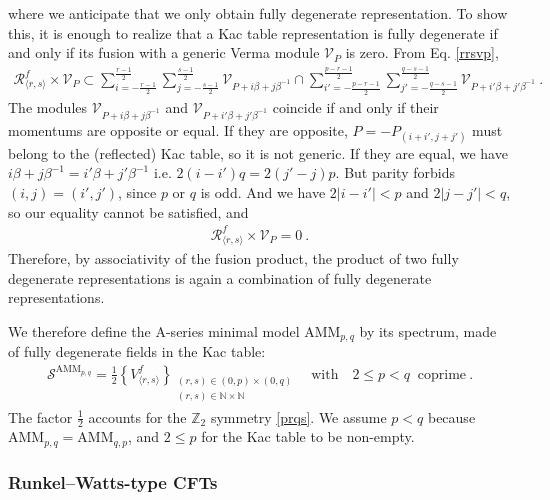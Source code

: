 \documentclass[12pt, a4paper]{article}
\theoremstyle{break}
\begin{document}
where we anticipate that we only obtain fully degenerate representation. To show this, it is enough to realize that a Kac table representation is fully degenerate if and only if its fusion with a generic Verma module $\mathcal{V}_P$ is zero. From Eq. \eqref{rrsvp}, 
\begin{align}
 \mathcal{R}^f_{\langle r,s\rangle}\times \mathcal{V}_P \subset \sum_{i=-\frac{r-1}{2}}^{\frac{r-1}{2}} \sum_{j=-\frac{s-1}{2}}^{\frac{s-1}{2}} \mathcal{V}_{P+i\beta +j\beta^{-1}} \cap \sum_{i'=-\frac{p-r-1}{2}}^{\frac{p-r-1}{2}} \sum_{j'=-\frac{q-s-1}{2}}^{\frac{q-s-1}{2}} \mathcal{V}_{P+i'\beta +j'\beta^{-1}}\ .
\end{align}
The modules $\mathcal{V}_{P+i\beta +j\beta^{-1}}$ and $\mathcal{V}_{P+i'\beta +j'\beta^{-1}}$ coincide if and only if their momentums are opposite or equal. If they are opposite, $P=-P_{(i+i',j+j')}$ must belong to the (reflected) Kac table, so it is not generic. If they are equal, we have $i\beta +j\beta^{-1} = i'\beta +j'\beta^{-1}$ i.e. $2(i-i')q = 2(j'-j)p$. 
But parity forbids $(i,j)=(i',j')$, since $p$ or $q$ is odd. And we have $2|i-i'|<p$ and $2|j-j'|<q$, so our equality cannot be satisfied, and 
\begin{align}
 \mathcal{R}^f_{\langle r,s\rangle}\times \mathcal{V}_P = 0 \ . 
\end{align}
Therefore, by associativity of the fusion product, the product of two fully degenerate representations is again a combination of fully degenerate representations.

We therefore define the A-series minimal model AMM$_{p,q}$ by its spectrum, made of fully degenerate fields in the Kac table:
\begin{align}
 \boxed{\mathcal{S}^{\text{AMM}_{p,q}} = \frac12\left\{ V^f_{\langle r,s\rangle} \right\}_{\substack{(r,s)\in (0,p) \times (0,q)\\ (r,s)\in \mathbb{N}\times \mathbb{N}}} \quad \text{with} \quad 2\leq p<q\ \text{ coprime}}\ .
 \label{samm}
\end{align}
The factor $\frac12$ accounts for the $\mathbb{Z}_2$ symmetry \eqref{prqs}. We assume $p<q$ because AMM$_{p, q}=$AMM$_{q,p}$, and $2\leq p$ for the Kac table to be non-empty.


\subsubsection{Runkel--Watts-type CFTs}\label{sec:rwt}
\end{document}
